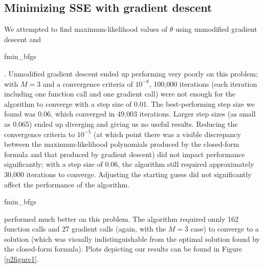 \documentclass{article}
\begin{document}
\subsection{Minimizing SSE with gradient descent}
We attempted to find maximum-likelihood values of $\theta$ using unmodified gradient descent and \begin{tt}fmin\_bfgs\end{tt}. Unmodified gradient descent ended up performing very poorly on this problem; with $M=3$ and a convergence criteria of $10^{-8}$, 100,000 iterations (each iteration including one function call and one gradient call) were not enough for the algorithm to converge with a step size of 0.01. The best-performing step size we found was 0.06, which converged in 49,003 iterations. Larger step sizes (as small as 0.065) ended up diverging and giving us no useful results. Reducing the convergence criteria to $10^{-5}$ (at which point there was a visible discrepancy between the maximum-likelihood polynomials produced by the closed-form formula and that produced by gradient descent) did not impact performance significantly; with a step size of 0.06, the algorithm still required approximately 30,000 iterations to converge. Adjusting the starting guess did not significantly affect the performance of the algorithm.

\begin{tt}fmin\_bfgs\end{tt} performed much better on this problem. The algorithm required onnly 162 function calls and 27 gradient calls (again, with the $M=3$ case) to converge to a solution (which was visually indistinguishable from the optimal solution found by the closed-form formula). Plots depicting our results can be found in Figure \ref{p2figure1}.
\end{document}
